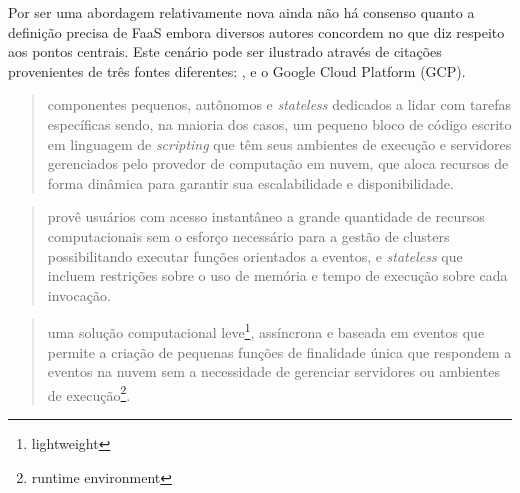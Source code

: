 \documentclass[english,brazilian]{UNISINOSmonografia} %
\begin{document}
Por ser uma abordagem relativamente nova ainda não há consenso quanto a definição precisa de FaaS embora diversos autores concordem no que diz respeito aos pontos centrais.
Este cenário pode ser ilustrado através de citações provenientes de três fontes diferentes: ,  e o Google Cloud Platform (GCP).
\begin{quote}
	componentes pequenos, autônomos e \textit{stateless} dedicados a lidar com tarefas específicas sendo, na maioria dos casos, um pequeno bloco de código escrito em linguagem de \textit{scripting} que têm seus ambientes de execução e servidores gerenciados pelo provedor de computação em nuvem, que aloca recursos de forma dinâmica para garantir sua escalabilidade e disponibilidade.
	\cite{Wang2018}
\end{quote}
\begin{quote}
	provê usuários com acesso instantâneo a grande quantidade de recursos computacionais sem o esforço necessário para a gestão de clusters possibilitando executar funções orientados a eventos, e \textit{stateless} que incluem restrições sobre o uso de memória e tempo de execução sobre cada invocação.
	\cite{Shankar2018}
\end{quote}
\begin{quote}
	uma solução computacional leve\footnote{lightweight}, assíncrona e baseada em eventos que permite a criação de pequenas funções de finalidade única que respondem a eventos na nuvem sem a necessidade de gerenciar servidores ou ambientes de execução\footnote{runtime environment}.
	\cite{GCP-FaaS}
	
\end{quote}
\end{document}
